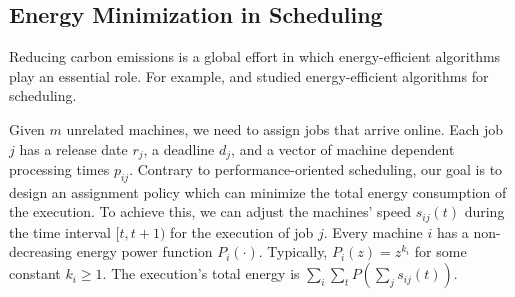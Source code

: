 %
%
%


\subsection{Energy Minimization in Scheduling}

Reducing carbon emissions is a global effort in which energy-efficient algorithms play an essential role. For example, \cite{Albers10:Energy-efficient-algorithms} and \cite{GuCaiZengZhangJinDai:2019} studied energy-efficient algorithms for scheduling.

Given $m$ unrelated machines, we need to assign jobs that arrive online. Each job $j$ has a release date $r_{j}$, a deadline $d_{j}$, and a vector of machine dependent processing times $p_{ij}$. Contrary to performance-oriented scheduling, our goal is to design an assignment policy which can minimize the total energy consumption of the execution. To achieve this, we can adjust the machines' speed $s_{ij}(t)$ during the time interval $[t,t+1)$ for the execution of job $j$. Every machine $i$ has a non-decreasing energy power function $P_{i}(\cdot)$. Typically, $P_{i}(z) = z^{k_{i}}$ for some constant $k_{i} \geq 1$. The execution's total energy is $\sum_{i} \sum_{t} P(\sum_{j} s_{ij}(t))$.

